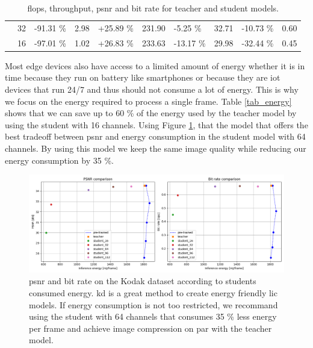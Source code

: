 \begin{table}[]
\begin{tabular}{|c|c|lr|lr|lr|lr|}
                             & 32                                                           & {\color[HTML]{656565} -91.31 \%}                       & 2.98                                              & {\color[HTML]{656565} +25.89 \%}            & 231.90 & {\color[HTML]{656565} -5.25 \%}  & 32.71 & {\color[HTML]{656565} -10.73 \%} & 0.60 \\ \cline{2-10}
                             & 16                                                           & {\color[HTML]{656565} -97.01 \%}                       & 1.02                                              & {\color[HTML]{656565} +26.83 \%}            & 233.63 & {\color[HTML]{656565} -13.17 \%} & 29.98 & {\color[HTML]{656565} -32.44 \%} & 0.45 \\ \hline
    \end{tabular}
    \caption[\acrshort{flop}s, throughput, \acrshort{psnr} and bit rate for teacher and student models.]{\acrshort{flop}s, throughput, \acrshort{psnr} and bit rate for teacher and student models.}
    \label{tab_compute}
\end{table}

Most edge devices also have access to a limited amount of energy whether it is in time because they run on battery like smartphones or because they are \acrfull{iot} devices that run 24/7 and thus should not consume a lot of energy. This is why we focus on the energy required to process a single frame. Table \ref{tab_energy} shows that we can save up to 60 \% of the energy used by the teacher model by using the student with 16 channels. Using Figure \ref{kd_lic_energy}, that the model that offers the best tradeoff between \acrshort{psnr} and energy consumption in the student model with 64 channels. By using this model we keep the same image quality while reducing our energy consumption by 35 \%.

\begin{figure}
    \centering
    \includegraphics[width=15cm]{../img/kd_lic_energy.png}
    \caption[\acrshort{psnr} and bit rate on the Kodak dataset according to students consumed energy.]{\acrshort{psnr} and bit rate on the Kodak dataset according to students consumed energy. \acrshort{kd} is a great method to create energy friendly \acrshort{lic} models. If energy consumption is not too restricted, we recommand using the student with 64 channels that consumes 35 \% less energy per frame and achieve image compression on par with the teacher model.}
    \label{kd_lic_energy}
\end{figure}

